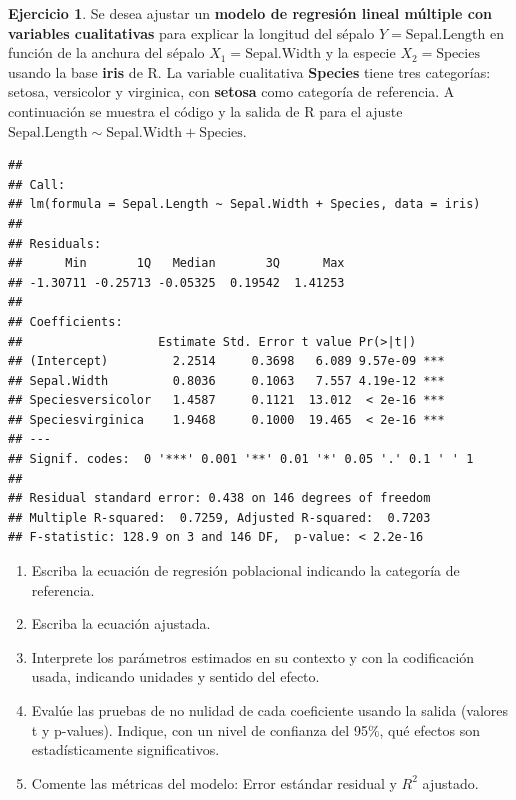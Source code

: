 \documentclass[
  11pt,
]{book}
\theoremstyle{definition}
\theoremstyle{definition}
\theoremstyle{definition}
\newtheorem{exercise}{Ejercicio}[chapter]
\theoremstyle{definition}
\theoremstyle{remark}
\begin{document}
\begin{exercise}

Se desea ajustar un \textbf{modelo de regresión lineal múltiple con variables cualitativas} para explicar la longitud del sépalo \(Y=\text{Sepal.Length}\) en función de la anchura del sépalo \(X_1=\text{Sepal.Width}\) y la especie \(X_2=\text{Species}\) usando la base \textbf{iris} de R. La variable cualitativa \textbf{Species} tiene tres categorías: setosa, versicolor y virginica, con \textbf{setosa} como categoría de referencia. A continuación se muestra el código y la salida de R para el ajuste \(\text{Sepal.Length} \sim \text{Sepal.Width} + \text{Species}\).

\begin{verbatim}
## 
## Call:
## lm(formula = Sepal.Length ~ Sepal.Width + Species, data = iris)
## 
## Residuals:
##      Min       1Q   Median       3Q      Max 
## -1.30711 -0.25713 -0.05325  0.19542  1.41253 
## 
## Coefficients:
##                   Estimate Std. Error t value Pr(>|t|)    
## (Intercept)         2.2514     0.3698   6.089 9.57e-09 ***
## Sepal.Width         0.8036     0.1063   7.557 4.19e-12 ***
## Speciesversicolor   1.4587     0.1121  13.012  < 2e-16 ***
## Speciesvirginica    1.9468     0.1000  19.465  < 2e-16 ***
## ---
## Signif. codes:  0 '***' 0.001 '**' 0.01 '*' 0.05 '.' 0.1 ' ' 1
## 
## Residual standard error: 0.438 on 146 degrees of freedom
## Multiple R-squared:  0.7259, Adjusted R-squared:  0.7203 
## F-statistic: 128.9 on 3 and 146 DF,  p-value: < 2.2e-16
\end{verbatim}

\begin{enumerate}
\def\labelenumi{\arabic{enumi}.}
\item
  Escriba la ecuación de regresión poblacional indicando la categoría de referencia.
\item
  Escriba la ecuación ajustada.
\item
  Interprete los parámetros estimados en su contexto y con la codificación usada, indicando unidades y sentido del efecto.
\item
  Evalúe las pruebas de no nulidad de cada coeficiente usando la salida (valores t y p-values). Indique, con un nivel de confianza del 95\%, qué efectos son estadísticamente significativos.
\item
  Comente las métricas del modelo: Error estándar residual y \(R^2\) ajustado.
\end{enumerate}

\end{exercise}
\end{document}
